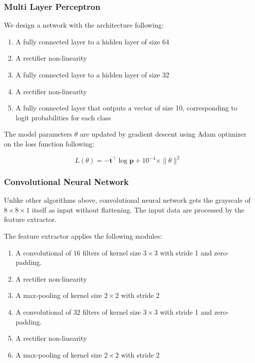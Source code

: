 \documentclass[main.tex]{subfiles}
\begin{document}
\subsubsection{Multi Layer Perceptron}
We design a network with the architecture following:
\begin{enumerate}[(1)]
	\item A fully connected layer to a hidden layer of size 64
	\item A rectifier non-linearity
	\item A fully connected layer to a hidden layer of size 32
	\item A rectifier non-linearity
	\item A fully connected layer that outputs a vector of size 10, corresponding to logit probabilities for each class
\end{enumerate}

The model parameters $\theta$ are updated by gradient descent using Adam optimizer on the loss function following:

\begin{equation} \label{crossentropy}
	L(\theta) = - \mathbf{t}^{\top} \log \mathbf{p} + 10^{-4} \times \|\theta\| ^2
\end{equation}


\subsubsection{Convolutional Neural Network}
Unlike other algorithms above, convolutional neural network gets the grayscale of $8 \times 8 \times 1$ itself as input without flattening.
The input data are processed by the feature extractor.

The feature extractor applies the following modules:
\begin{enumerate}[(1)]
	\item A convolutional of $16$ filters of kernel size $3 \times 3$ with stride 1 and zero-padding.
	\item A rectifier non-linearity
	\item A max-pooling of kernel size $2 \times 2$ with stride 2
	\item A convolutional of $32$ filters of kernel size $3 \times 3$ with stride 1 and zero-padding.
	\item A rectifier non-linearity
	\item A max-pooling of kernel size $2 \times 2$ with stride 2
\end{enumerate}
\end{document}
